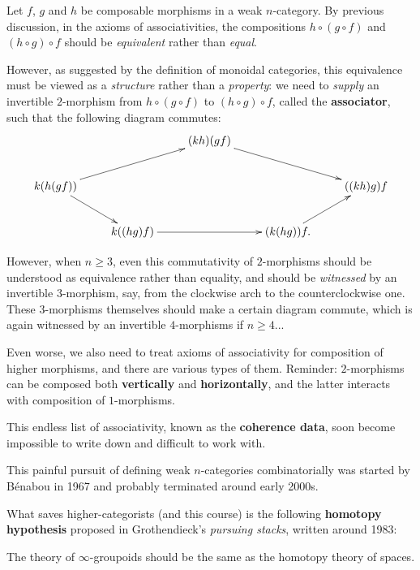 \ssec{}
Let $f$, $g$ and $h$ be composable morphisms in a weak $n$-category. By previous discussion, in the axioms of associativities, the compositions $h\circ (g\circ f)$ and $(h\circ g) \circ f$ should be \emph{equivalent} rather than \emph{equal}. 

\medskip

However, as suggested by the definition of monoidal categories, this equivalence must be viewed as a \emph{structure} rather than a \emph{property}: we need to \emph{supply} an invertible $2$-morphism from $h\circ (g\circ f)$ to $(h\circ g) \circ f$, called the \textbf{associator}, such that the following diagram commutes:
\[
	\xymatrix{
		& & (kh)(gf) \ar[rrd] \\
		k(h(gf)) \ar[rru] \ar[rd]
		& & & & ((kh)g)f \\
		& k((hg)f) \ar[rr]
		& & (k(hg))f. \ar[ru]
	}
\]

\medskip

However, when $n\ge 3$, even this commutativity of $2$-morphisms should be understood as equivalence rather than equality, and should be \emph{witnessed} by an invertible $3$-morphism, say, from the clockwise arch to the counterclockwise one. These $3$-morphisms themselves should make a certain diagram commute, which is again witnessed by an invertible $4$-morphisms if $n\ge 4$...

\medskip

Even worse, we also need to treat axioms of associativity for composition of higher morphisms, and there are various types of them. Reminder: $2$-morphisms can be composed both \textbf{vertically} and \textbf{horizontally}, and the latter interacts with composition of $1$-morphisms.

\medskip

This endless list of associativity, known as the \textbf{coherence data}, soon become impossible to write down and difficult to work with.

\ssec{}
	
This painful pursuit of defining weak $n$-categories combinatorially was started by Bénabou in 1967 and probably terminated around early 2000s.


\ssec{}

What saves higher-categorists (and this course) is the following \textbf{homotopy hypothesis} proposed in Grothendieck's \emph{pursuing stacks}, written around 1983:

\begin{slog}
	The theory of $\infty$-groupoids should be the same as the homotopy theory of spaces.
\end{slog}

